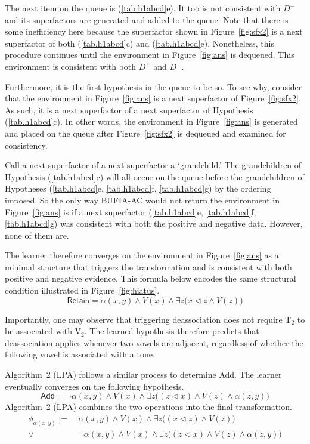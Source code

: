 The next item on the queue is (\ref{tab.h1abcd}e). It too is not
consistent with \(D^-\) and its superfactors are generated and added to the queue. Note that there is
some inefficiency here because the superfactor shown in
Figure~\ref{fig:sfx2} is a next superfactor of both (\ref{tab.h1abcd}c)
and (\ref{tab.h1abcd}e). Nonetheless, this procedure continues until the
environment in Figure~\ref{fig:ans} is dequeued. This environment is
consistent with both \(D^+\) and \(D^-\).

Furthermore, it is the first hypothesis in the queue to be so. To see
why, consider that the environment in Figure~\ref{fig:ans} is a next
superfactor of Figure~\ref{fig:sfx2}. As such, it is a next superfactor
of a next superfactor of Hypothesis (\ref{tab.h1abcd}c). In other words,
the environment in Figure~\ref{fig:ans} is generated and placed on the
queue after Figure~\ref{fig:sfx2} is dequeued and examined for
consistency.

Call a next superfactor of a next superfactor a `grandchild.' The
grandchildren of Hypothesis (\ref{tab.h1abcd}c) will all occur on the
queue before the grandchildren of Hypotheses (\ref{tab.h1abcd}e,
\ref{tab.h1abcd}f, \ref{tab.h1abcd}g) by the ordering imposed. So the
only way BUFIA-AC would not return the environment in
Figure~\ref{fig:ans} is if a next superfactor (\ref{tab.h1abcd}e,
\ref{tab.h1abcd}f, \ref{tab.h1abcd}g) was consistent with both the
positive and negative data. However, none of them are.

The learner therefore converges on the environment in
Figure~\ref{fig:ans} as a minimal structure that triggers the
transformation and is consistent with both positive and negative
evidence. This formula below encodes the same structural condition
illustrated in Figure~\ref{fig:hiatus}.
\begin{equation}
	\textsf{Retain}
	=
	\alpha(x,y)
	\land
	V(x)\land \exists z \bigl(x \lhd z \land V(z)\bigr)
\end{equation}

Importantly, one may observe that triggering deassociation does not
require T$_2$ to be associated with V$_2$. The learned hypothesis
therefore predicts that deassociation applies whenever two vowels are
adjacent, regardless of whether the following vowel is associated with
a tone. %

Algorithm~2 (LPA) follows a similar process to determine \textsf{Add}.
The learner eventually converges on the following hypothesis.
\begin{equation}
	\textsf{Add}
	=
	\neg \alpha(x,y) \land V(x) \land \exists z \big((z \lhd x) \land V(z) \land \alpha (z,y)\big)
\end{equation}
Algorithm~2 (LPA) combines the two operations into the final
transformation.
\begin{align}
	\phi_{\alpha(x,y)} :=\ &
	\alpha(x,y)\land V(x)
	\land \exists z\big((x\lhd z)\land V(z)\big) \nonumber \\
	\lor\ &
	\neg\alpha(x,y)\land V(x)
	\land \exists z\big((z\lhd x)\land V(z)\land \alpha(z,y)\big)
\end{align}

